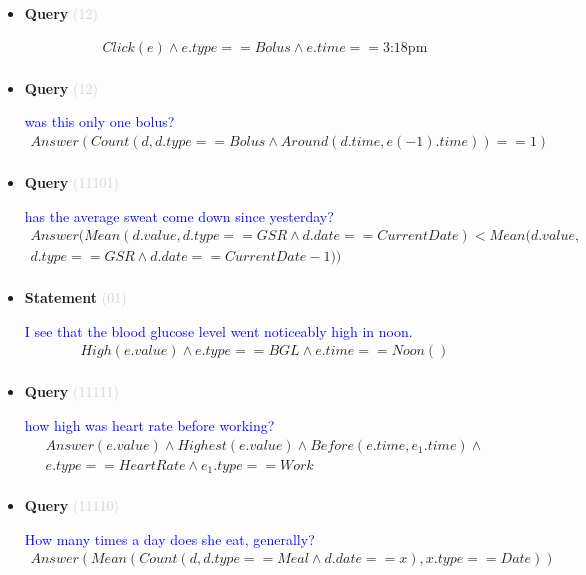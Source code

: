 \documentclass[11pt]{article}
\newcommand{\key}[1]{\textcolor{lightgray}{#1}}
\newcounter{CQuery}
\newcounter{CStatement}
\begin{document}
\begin{itemize}
\item
\textbf{Query\theCQuery} \key{(12)} \addtocounter{CQuery}{1}
\textcolor{blue}{  }
\begin{multline*}
Click(e) \wedge e.type == Bolus \wedge e.time==\mbox{3:18pm} \\ 
\end{multline*}


\item
\textbf{Query\theCQuery} \key{(12)} \addtocounter{CQuery}{1}
\textcolor{blue}{ was this only one bolus? }
\begin{multline*}
Answer(Count(d, d.type==Bolus \wedge Around(d.time, e(-1).time))==1) \\ 
\end{multline*}


\item
\textbf{Query\theCQuery} \key{(11101)} \addtocounter{CQuery}{1}
\textcolor{blue}{ has the average sweat come down since yesterday? }
\begin{multline*}
Answer(Mean(d.value, d.type==GSR \wedge d.date==CurrentDate) < Mean(d.value, \\ 
d.type==GSR \wedge d.date==CurrentDate-1)) \\ 
\end{multline*}


\item
\textbf{Statement\theCStatement} \key{(01)} \addtocounter{CStatement}{1}
\textcolor{blue}{ I see that the blood glucose level went noticeably high in noon. }
\begin{multline*}
High(e.value) \wedge e.type==BGL \wedge e.time==Noon() \\ 
\end{multline*}


\item
\textbf{Query\theCQuery} \key{(11111)} \addtocounter{CQuery}{1}
\textcolor{blue}{ how high was heart rate before working? }
\begin{multline*}
Answer(e.value) \wedge Highest(e.value) \wedge Before(e.time, e_1.time) \wedge \\ 
e.type==HeartRate \wedge e_1.type==Work \\ 
\end{multline*}


\item
\textbf{Query\theCQuery} \key{(11110)} \addtocounter{CQuery}{1}
\textcolor{blue}{ How many times a day does she eat, generally? }
\begin{multline*}
Answer(Mean(Count(d, d.type==Meal \wedge d.date==x), x.type==Date)) \\ 
\end{multline*}



\end{itemize}
\end{document}
